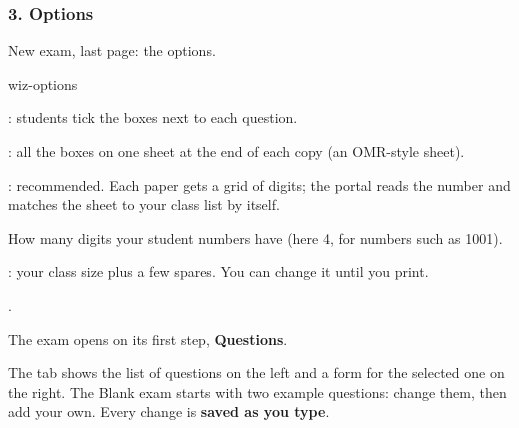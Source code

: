 \documentclass[11pt]{article}
\begin{document}

\subsubsection{3. Options}

\begin{keep}
\begin{guidefig}{New exam, last page: the options.}
\begin{shot}[0.92\linewidth]{wiz-options}
\end{shot}
\end{guidefig}
\begin{callouts}
  \item {}: students tick the boxes next to each question.
  \item {}: all the boxes on one sheet at the end of each copy (an OMR-style sheet).
  \item {}: recommended. Each paper gets a grid of digits; the portal reads the number and matches the sheet to your class list by itself.
  \item How many digits your student numbers have (here 4, for numbers such as 1001).
  \item {}: your class size plus a few spares. You can change it until you print.
  \item {}.
\end{callouts}
\end{keep}

The exam opens on its first step, \textbf{Questions}.

\label{step:questions}

The  tab shows the list of questions on the left and a form for the selected one on the right. The Blank exam starts with two example questions: change them, then add your own. Every change is \textbf{saved as you type}.
\end{document}
